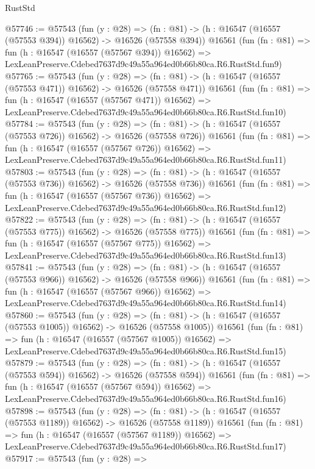 \begin{lexlean}{RustStd}
\begin{coremodule}
@57746 := @57543
    (fun (y : @28) =>
    (fn : @81) -> (h : @16547 (@16557 (@57553 @394)) @16562) -> @16526 (@57558 @394))
    @16561
    (fun (fn : @81) =>
    fun (h : @16547 (@16557 (@57567 @394)) @16562) =>
    LexLeanPreserve.Cdebed7637d9c49a55a964ed0b66b80ca.R6.RustStd.fun9)
@57765 := @57543
    (fun (y : @28) =>
    (fn : @81) -> (h : @16547 (@16557 (@57553 @471)) @16562) -> @16526 (@57558 @471))
    @16561
    (fun (fn : @81) =>
    fun (h : @16547 (@16557 (@57567 @471)) @16562) =>
    LexLeanPreserve.Cdebed7637d9c49a55a964ed0b66b80ca.R6.RustStd.fun10)
@57784 := @57543
    (fun (y : @28) =>
    (fn : @81) -> (h : @16547 (@16557 (@57553 @726)) @16562) -> @16526 (@57558 @726))
    @16561
    (fun (fn : @81) =>
    fun (h : @16547 (@16557 (@57567 @726)) @16562) =>
    LexLeanPreserve.Cdebed7637d9c49a55a964ed0b66b80ca.R6.RustStd.fun11)
@57803 := @57543
    (fun (y : @28) =>
    (fn : @81) -> (h : @16547 (@16557 (@57553 @736)) @16562) -> @16526 (@57558 @736))
    @16561
    (fun (fn : @81) =>
    fun (h : @16547 (@16557 (@57567 @736)) @16562) =>
    LexLeanPreserve.Cdebed7637d9c49a55a964ed0b66b80ca.R6.RustStd.fun12)
@57822 := @57543
    (fun (y : @28) =>
    (fn : @81) -> (h : @16547 (@16557 (@57553 @775)) @16562) -> @16526 (@57558 @775))
    @16561
    (fun (fn : @81) =>
    fun (h : @16547 (@16557 (@57567 @775)) @16562) =>
    LexLeanPreserve.Cdebed7637d9c49a55a964ed0b66b80ca.R6.RustStd.fun13)
@57841 := @57543
    (fun (y : @28) =>
    (fn : @81) -> (h : @16547 (@16557 (@57553 @966)) @16562) -> @16526 (@57558 @966))
    @16561
    (fun (fn : @81) =>
    fun (h : @16547 (@16557 (@57567 @966)) @16562) =>
    LexLeanPreserve.Cdebed7637d9c49a55a964ed0b66b80ca.R6.RustStd.fun14)
@57860 := @57543
    (fun (y : @28) =>
    (fn : @81) -> (h : @16547 (@16557 (@57553 @1005)) @16562) -> @16526 (@57558 @1005))
    @16561
    (fun (fn : @81) =>
    fun (h : @16547 (@16557 (@57567 @1005)) @16562) =>
    LexLeanPreserve.Cdebed7637d9c49a55a964ed0b66b80ca.R6.RustStd.fun15)
@57879 := @57543
    (fun (y : @28) =>
    (fn : @81) -> (h : @16547 (@16557 (@57553 @594)) @16562) -> @16526 (@57558 @594))
    @16561
    (fun (fn : @81) =>
    fun (h : @16547 (@16557 (@57567 @594)) @16562) =>
    LexLeanPreserve.Cdebed7637d9c49a55a964ed0b66b80ca.R6.RustStd.fun16)
@57898 := @57543
    (fun (y : @28) =>
    (fn : @81) -> (h : @16547 (@16557 (@57553 @1189)) @16562) -> @16526 (@57558 @1189))
    @16561
    (fun (fn : @81) =>
    fun (h : @16547 (@16557 (@57567 @1189)) @16562) =>
    LexLeanPreserve.Cdebed7637d9c49a55a964ed0b66b80ca.R6.RustStd.fun17)
@57917 := @57543
    (fun (y : @28) =>

\end{coremodule}
\end{lexlean}
